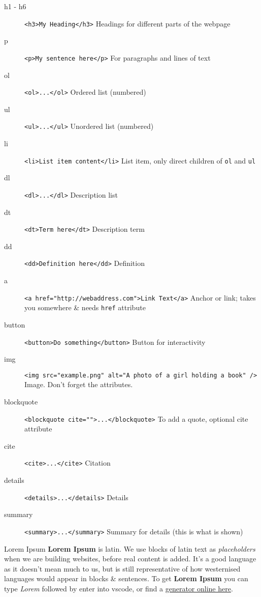 \begin{description}
	\item[h1 - h6] \texttt{<h3>My Heading</h3>} Headings for different parts of the webpage
	\item[p] \texttt{<p>My sentence here</p>} For paragraphs and lines of text
	\item[ol] \texttt{<ol>...</ol>} Ordered list (numbered)
	\item[ul] \texttt{<ul>...</ul>} Unordered list (numbered)
	\item[li] \texttt{<li>List item content</li>} List item, only direct children of \texttt{ol} and \texttt{ul}
	\item[dl] \texttt{<dl>...</dl>} Description list
	\item[dt] \texttt{<dt>Term here</dt>} Description term
	\item[dd] \texttt{<dd>Definition here</dd>} Definition
	\item[a] \texttt{<a href="http://webaddress.com">Link Text</a>} Anchor or link; takes you somewhere \& needs \texttt{href} attribute
	\item[button] \texttt{<button>Do something</button>} Button for interactivity
	\item[img] \texttt{<img src="example.png" alt="A photo of a girl holding a book" />} Image. Don't forget the attributes.
	\item[blockquote] \texttt{<blockquote cite="">...</blockquote>} To add a quote, optional cite attribute
	\item[cite] \texttt{<cite>...</cite>} Citation
	\item[details] \texttt{<details>...</details>} Details
	\item[summary] \texttt{<summary>...</summary>} Summary for details (this is what is shown)
\end{description}

\begin{infobox}{Lorem Ipsum}
    \textbf{Lorem Ipsum} is latin. We use blocks of latin text as \textit{placeholders} when we are building websites, before real content is added. It's a good language as it doesn't mean much to us, but is still representative of how westernised languages would appear in blocks \& sentences.
    To get \textbf{Lorem Ipsum} you can type \textit{Lorem} followed by enter into vscode, or find a \href{https://www.lipsum.com/}{generator online here}.
\end{infobox}

